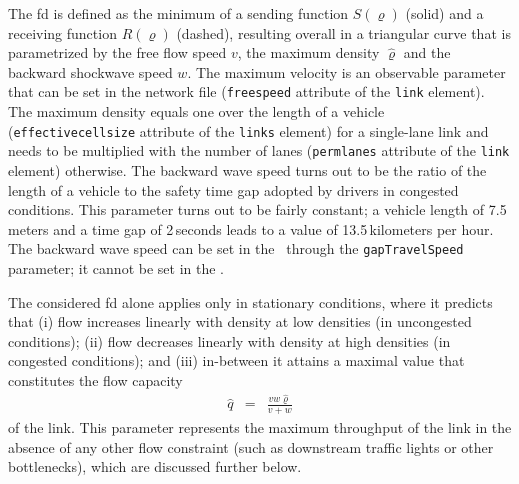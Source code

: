 The \gls{fd} is defined as the minimum of a sending function $S(\varrho)$
(solid) and a receiving function $R(\varrho)$ (dashed), resulting
overall in a triangular curve that is parametrized by the free flow speed $v$, 
the maximum density $\hat{\varrho}$ and the
backward shockwave speed $w$. The maximum velocity is an observable
parameter that can be set in the network file (\texttt{freespeed}
attribute of the \texttt{link} element). The maximum density equals
one over the length of a vehicle (\texttt{effectivecellsize} attribute
of the \texttt{links} element) for a single-lane link and needs to
be multiplied with the number of lanes (\texttt{permlanes} attribute
of the \texttt{link} element) otherwise. The backward wave speed turns
out to be the ratio of the length of a vehicle to the safety time
gap adopted by drivers in congested conditions. This parameter turns
out to be fairly constant; a vehicle length of 7.5\,meters and a time
gap of 2\,seconds leads to a value of 13.5\,kilometers per hour. 
The backward wave speed can be set in the \DOUBLEQUEUESIM\ through the
\lstinline|gapTravelSpeed| parameter; it cannot be set in the
\SINGLEQUEUESIM.

The considered \gls{fd} alone applies only in stationary conditions, where
it predicts that (i) flow increases linearly with density at low densities
(\ie in uncongested conditions); (ii) flow decreases linearly with
density at high densities (\ie in congested conditions); and (iii)
in-between it attains a maximal value that constitutes the flow capacity
\begin{eqnarray}
\hat{q} & = & \frac{vw\hat{\varrho}}{v+w}\label{eq:flow-cap}
\end{eqnarray}
 of the link. This parameter represents the maximum throughput of
the link in the absence of any other flow constraint (such as downstream
traffic lights or other bottlenecks), which are discussed further
below.

